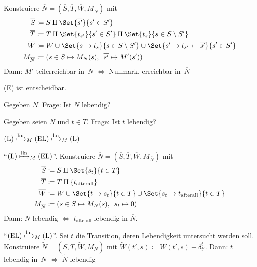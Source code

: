 \documentclass{cheat-sheet}
\newcommand{\reducesManyOneToLin}{\xmapsto{\mathrm{lin}}_M} %
\begin{document}
\begin{beweis}[$\text{(TE)}  \reducesManyOneToLin \text{(0-E)}$]
  Konstruiere $\overline{N} = (\overline{S}, \overline{T}, \overline{W}, M_{\overline{N}})$ mit
  \begin{align*}
    \overline{S} & \coloneqq S \amalg \Set{\overline{s'}}{s' \in S'} \\
    \overline{T} & \coloneqq T \amalg \Set{t_{s'}}{s' \in S'} \amalg \Set{t_s}{s \in S \setminus S'} \\
    \overline{W} & \coloneqq W \cup \Set{s \to t_s}{s \in S \setminus S'} \cup \Set{s' \to t_{s'} \leftarrow \overline{s'}}{s' \in S'} \\
    M_{\overline{N}} & \coloneqq (s \in S \mapsto M_N(s), \enspace \overline{s'} \mapsto M'(s'))
  \end{align*}
  Dann: $M'$ teilerreichbar in~$N$ $\iff$ Nullmark. erreichbar in~$\overline{N}$
\end{beweis}

\begin{satz}
  (E) ist entscheidbar.
\end{satz}


\begin{problem}
  Gegeben $N$. Frage: Ist $N$ lebendig?
\end{problem}

\begin{problem}
  Gegeben seien $N$ und $t \in T$.
  Frage: Ist $t$ lebendig?
\end{problem}


\begin{satz}
  $\text{(L)} \reducesManyOneToLin \text{(EL)} \reducesManyOneToLin \text{(L)}$
\end{satz}

\begin{beweis}
  "`$\text{(L)} \reducesManyOneToLin \text{(EL)}$"'.
  Konstruiere $\overline{N} = (\overline{S}, \overline{T}, \overline{W}, M_{\overline{N}})$ mit
  \begin{align*}
    \overline{S} & \coloneqq S \amalg \Set{s_t}{t \in T} \\
    \overline{T} & \coloneqq T \amalg \{ t_\mathrm{afterall} \} \\
    \overline{W} & \coloneqq W \cup \Set{t \to s_t}{t \in T} \cup \Set{s_t \to t_\mathrm{afterall}}{t \in T} \\
    M_{\overline{N}} & \coloneqq (s \in S \mapsto M_N(s), \enspace s_t \mapsto 0)
  \end{align*}
  Dann: $N$ lebendig $\iff$ $t_\mathrm{afterall}$ lebendig in $\overline{N}$.

  "`$\text{(EL)} \reducesManyOneToLin \text{(L)}$"'.
  Sei $t$ die Transition, deren Lebendigkeit untersucht werden soll.
  Konstruiere $\tilde{N} = (S, T, \tilde{W}, M_N)$ mit
  $\tilde{W}(t', s) \coloneqq W(t', s) + \delta^t_{t'}$.
  Dann: $t$ lebendig in~$N$ $\iff$ $\tilde{N}$ lebendig
\end{beweis}
\end{document}
